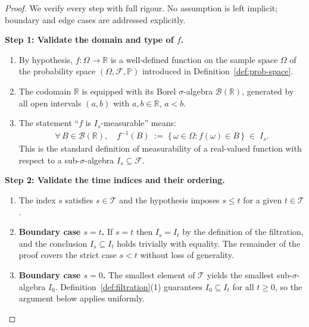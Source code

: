 \documentclass[12pt,openany]{book}
\newcommand{\calI}{\mathcal{I}}
\numberwithin{equation}{chapter}
\theoremstyle{plain}
\theoremstyle{definition}
\theoremstyle{remark}
\numberwithin{equation}{chapter}
\theoremstyle{plain}
\def\calI{I}%
\begin{document}
\begin{proof}
We verify every step with full rigour.  No assumption is left
implicit; boundary and edge cases are addressed explicitly.

\medskip
\noindent\textbf{Step 1: Validate the domain and type of $f$.}
\begin{enumerate}
  \item By hypothesis, $f : \Omega \to \mathbb{R}$ is a
        well-defined function on the sample space $\Omega$ of the
        probability space $(\Omega, \mathcal{F}, \mathbb{P})$
        introduced in Definition~\ref{def:prob-space}.
  \item The codomain $\mathbb{R}$ is equipped with its Borel
        $\sigma$-algebra $\mathcal{B}(\mathbb{R})$, generated by
        all open intervals $(a, b)$ with $a, b \in \mathbb{R}$,
        $a < b$.
  \item The statement ``$f$ is $\calI_s$-measurable'' means:
        \begin{align}
          \forall\, B \in \mathcal{B}(\mathbb{R}),
          \quad
          f^{-1}(B)
          \;:=\;
          \{\,\omega \in \Omega : f(\omega) \in B\,\}
          \;\in\; \calI_s.
        \end{align}
        This is the standard definition of measurability of a
        real-valued function with respect to a sub-$\sigma$-algebra
        $\calI_s \subseteq \mathcal{F}$.
\end{enumerate}

\medskip
\noindent\textbf{Step 2: Validate the time indices and their
ordering.}
\begin{enumerate}
  \item The index $s$ satisfies $s \in \mathcal{T}$ and the
        hypothesis imposes $s \leq t$ for a given
        $t \in \mathcal{T}$.
  \item \textbf{Boundary case $s = t$.}  If $s = t$ then
        $\calI_s = \calI_t$ by the definition of the filtration,
        and the conclusion $\calI_s \subseteq \calI_t$ holds
        trivially with equality.  The remainder of the proof
        covers the strict case $s < t$ without loss of generality.
  \item \textbf{Boundary case $s = 0$.}  The smallest element of
        $\mathcal{T}$ yields the smallest sub-$\sigma$-algebra
        $\calI_0$.  Definition~\ref{def:filtration}(1) guarantees
        $\calI_0 \subseteq \calI_t$ for all $t \geq 0$, so the
        argument below applies uniformly.
\end{enumerate}


\end{proof}
\end{document}
